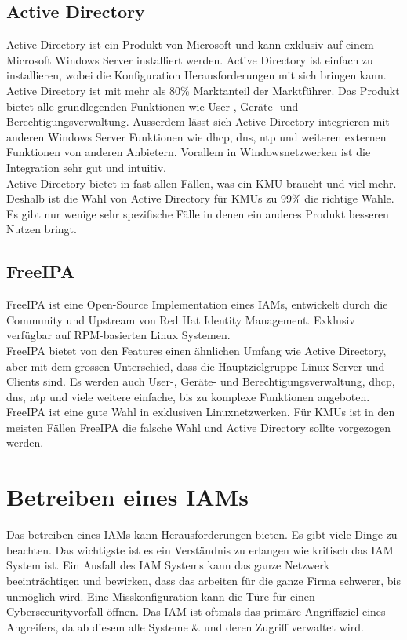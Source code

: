 \subsection{Active Directory}
Active Directory ist ein Produkt von Microsoft und kann exklusiv auf einem Microsoft Windows Server installiert werden. Active Directory ist einfach zu installieren, wobei die Konfiguration Herausforderungen mit sich bringen kann.\\

Active Directory ist mit mehr als 80\% Marktanteil der Marktführer. 
Das Produkt bietet alle grundlegenden Funktionen wie User-, Geräte- und Berechtigungsverwaltung.
Ausserdem lässt sich Active Directory integrieren mit anderen Windows Server Funktionen wie \acrshort{dhcp}, \acrshort{dns}, \acrshort{ntp} und weiteren externen Funktionen von anderen Anbietern. 
Vorallem in Windowsnetzwerken ist die Integration sehr gut und intuitiv.\\


Active Directory bietet in fast allen Fällen, was ein KMU braucht und viel mehr. Deshalb ist die Wahl von Active Directory für KMUs zu 99\% die richtige Wahle. Es gibt nur wenige sehr spezifische Fälle in denen ein anderes Produkt besseren Nutzen bringt. 


\subsection{FreeIPA}
FreeIPA ist eine Open-Source Implementation eines IAMs, entwickelt durch die Community und Upstream von Red Hat Identity Management. Exklusiv verfügbar auf RPM-basierten Linux Systemen.\\

FreeIPA bietet von den Features einen ähnlichen Umfang wie Active Directory, aber mit dem grossen Unterschied, dass die Hauptzielgruppe Linux Server und Clients sind. Es werden auch User-, Geräte- und Berechtigungsverwaltung, \acrshort{dhcp}, \acrshort{dns}, \acrshort{ntp} und viele weitere einfache, bis zu komplexe Funktionen angeboten.\\

FreeIPA ist eine gute Wahl in exklusiven Linuxnetzwerken. Für KMUs ist in den meisten Fällen FreeIPA die falsche Wahl und Active Directory sollte vorgezogen werden.


\section{Betreiben eines IAMs}
Das betreiben eines IAMs kann Herausforderungen bieten.
Es gibt viele Dinge zu beachten.
Das wichtigste ist es ein Verständnis zu erlangen wie kritisch das IAM System ist.
Ein Ausfall des IAM Systems kann das ganze Netzwerk beeinträchtigen und bewirken, dass das arbeiten für die ganze Firma schwerer, bis unmöglich wird.
Eine Misskonfiguration kann die Türe für einen Cybersecurityvorfall öffnen.
Das IAM ist oftmals das primäre Angriffsziel eines Angreifers, da ab diesem alle Systeme \& und deren Zugriff verwaltet wird.\\

